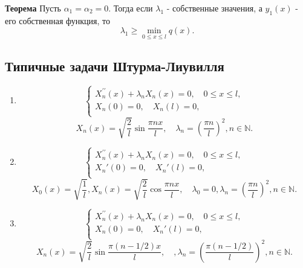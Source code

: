 \documentclass{article}
\begin{document}
\noindent\textbf{Теорема} Пусть $\alpha_1=\alpha_2=0$. Тогда если $\lambda_1$ - собственные значения, а $y_1(x)$ - его собственная функция, то 
\begin{equation}
\lambda_1\ge \min_{0\le x\le l} q(x).
\end{equation}

\subsection{Типичные задачи Штурма-Лиувилля}
\begin{enumerate}
	\item  \begin{equation}
	\left\{\begin{array}{cc}
	X_n^{\prime \prime}(x)+\lambda_nX_n(x)=0,\quad 0\le x\le l,\\
	X_n(0)=0,\quad X_n(l)=0,\\
	\end{array}\right.
	\end{equation}
	\begin{equation}
	X_n(x)=\sqrt{\frac{2}{l}}\sin\frac{\pi nx}{l},\quad\lambda_n=\left( \frac{\pi n}{l}\right)^2,n\in\mathbb{N}.
	\end{equation}
	
	\item  \begin{equation}
	\left\{\begin{array}{cc}
	X_n^{\prime \prime}(x)+\lambda_nX_n(x)=0,\quad 0\le x\le l,\\
	X_n'(0)=0,\quad X_n'(l)=0,\\
	\end{array}\right.
	\end{equation}
	\begin{equation}
	X_0(x)=\sqrt{\frac{1}{l}},X_n(x)=\sqrt{\frac{2}{l}}\cos\frac{\pi nx}{l},\quad\lambda_0=0,\lambda_n=\left( \frac{\pi n}{l}\right)^2,n\in\mathbb{N}.
	\end{equation}
	
	\item  \begin{equation}
	\left\{\begin{array}{cc}
	X_n^{\prime \prime}(x)+\lambda_nX_n(x)=0,\quad 0\le x\le l,\\
	X_n(0)=0,\quad X_n'(l)=0,\\
	\end{array}\right.
	\end{equation}
	\begin{equation}
	X_n(x)=\sqrt{\frac{2}{l}}\sin\frac{\pi (n-1/2)x}{l},\quad,\lambda_n=\left( \frac{\pi (n-1/2)}{l}\right)^2,n\in\mathbb{N}.
	\end{equation}
	

\end{enumerate}
\end{document}
